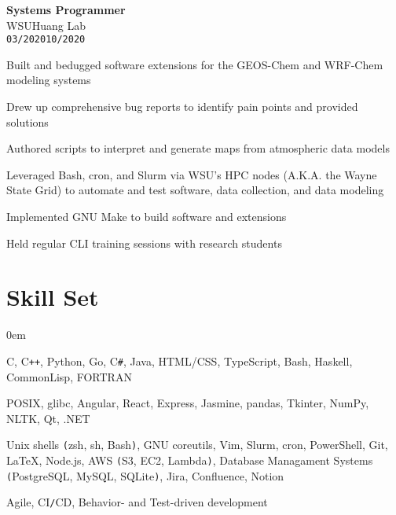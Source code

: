 \documentclass[10pt]{article}
\newenvironment{itemize*}%
  {\begin{itemize}[leftmargin=*,label=\faChevronRight]%
    \setlength{\itemsep}{0pt}%
    \setlength{\parskip}{0pt}%
    \setlength{\parsep}{0pt}}%
  {\end{itemize}}
\newcommand\workexp[5]{
    \begin{minipage}[t]{0.215\textwidth}
            \raggedleft
                \textbf{\fontsize{13}{10}\selectfont #1}\\ 
                #2\\
                \small\texttt{#3}\textendash \texttt{#4}
    \end{minipage}\hspace*{5pt}%
    \begin{minipage}[t]{0.75\textwidth}
        \raggedright
        \fontsize{10}{10}\selectfont#5
    \end{minipage}
}
\begin{document}
\workexp{Systems Programmer}{WSU\textendash Huang Lab}{03/2020}{10/2020}{%
    \begin{itemize*}
        \item Built and bedugged software extensions for the GEOS-Chem and WRF-Chem modeling systems
        \item Drew up comprehensive bug reports to identify pain points and provided solutions
        \item Authored scripts to interpret and generate maps from atmospheric data models
        \item Leveraged Bash, cron, and Slurm via WSU's HPC nodes (A.K.A. the Wayne State Grid) to automate and test software, 
              data collection, and data modeling
        \item Implemented GNU Make to build software and extensions
        \item Held regular CLI training sessions with research students
    \end{itemize*}%
}

\vspace*{-10pt}
\section*{Skill Set}
\vspace*{-8pt}\hspace*{10pt}\begin{minipage}{0.935\textwidth}
    \begin{description}
        \itemsep0em
        \raggedright
        \item[Languages] C, C\texttt{++}, Python, Go, C\texttt{\#}, Java, HTML/CSS, TypeScript, Bash, Haskell, CommonLisp, FORTRAN
        \item[Frameworks\texttt{/}Libraries] POSIX, glibc, Angular, React, Express, Jasmine, pandas, Tkinter, NumPy, NLTK,
            Qt, .NET
        \item[Tools] Unix shells \texttt{(}zsh, sh, Bash\texttt{)}, GNU coreutils, Vim, Slurm, cron, PowerShell, Git, \LaTeX, Node.js,
            AWS \texttt{(}S3, EC2, Lambda\texttt{)}, Database Managament Systems \texttt{(}PostgreSQL, MySQL, SQLite\texttt{)}, Jira, Confluence, Notion
        \item[Methodologies] Agile, CI\texttt{/}CD, Behavior- and Test-driven development
    \end{description}
\end{minipage}

\vspace*{-10pt}
\end{document}

